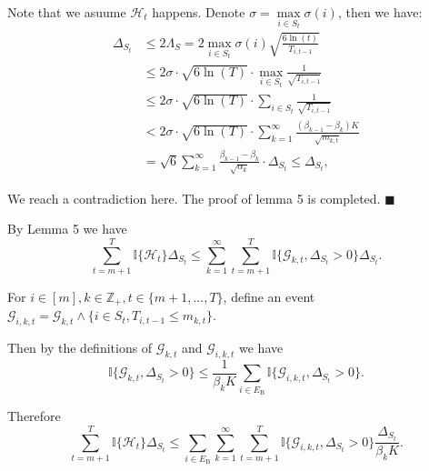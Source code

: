 \documentclass[opre,sglanonrev]{informs4}
\begin{document}
Note that we asuume $\mathcal{H}_t$ happens. Denote $\sigma = \mathop{\max}\limits_{i\in S_t}\sigma(i)$, then we have: 
$$\begin{aligned}
\Delta_{S_t} & \leq 2\Lambda_S=2\mathop{\max}\limits_{i\in S_t}\sigma(i)\sqrt{\frac{6\ln(t)}{T_{i,t-1}}}\\
&\leq 2\sigma \cdot \sqrt{6\ln(T)}\cdot \mathop{\max}\limits_{i\in S_t}\frac{1}{\sqrt{T_{i,t-1}}}\\
&\leq 2\sigma \cdot \sqrt{6\ln(T)}\cdot \sum_{i\in S_t}\frac{1}{\sqrt{T_{i,t-1}}}\\
&<2\sigma \cdot \sqrt{6\ln(T)}\cdot \sum_{k=1}^\infty\frac{(\beta_{k-1}-\beta_k)K}{\sqrt{m_{k,t}}}\\
&=\sqrt{6}\sum_{k=1}^\infty\frac{\beta_{k-1}-\beta_k}{\sqrt{\alpha_k}}\cdot \Delta_{S_t}\leq\Delta_{S_t},
\end{aligned}$$

We reach a contradiction here. The proof of lemma 5 is completed.
\hfill $\blacksquare$

By Lemma 5 we have
$$\sum_{t=m+1}^T\mathbb{I} \{\mathcal{H}_t\}\Delta_{S_t}\leq\sum_{k=1}^\infty\sum_{t=m+1}^T\mathbb{I}\{\mathcal{G}_{k,t},\Delta_{S_t}>0\}\Delta_{S_t}.$$

For $i\in [m], k\in \mathbb{Z}_+, t\in \{m+1,...,T\}$, define an event $\mathcal{G}_{i,k,t}=\mathcal{G}_{k,t}\wedge\{i\in S_t,T_{i,t-1}\leq m_{k,t}\}.$

Then by the definitions of $\mathcal{G}_{k,t}$ and $\mathcal{G}_{i,k,t}$ we have
$$\mathbb{I}\{\mathcal{G}_{k,t},\Delta_{S_t}>0\}\leq\frac{1}{\beta_kK}\sum_{i\in E_\mathrm{B}}\mathbb{I}\{\mathcal{G}_{i,k,t},\Delta_{S_t}>0\}.$$

Therefore
$$\sum_{t=m+1}^T\mathbb{I}\{\mathcal{H}_t\}\Delta_{S_t}\leq\sum_{i\in E_\mathrm{B}}\sum_{k=1}^\infty\sum_{t=m+1}^T\mathbb{I}\{\mathcal{G}_{i,k,t},\Delta_{S_t}>0\}\frac{\Delta_{S_t}}{\beta_kK}.$$
\end{document}
